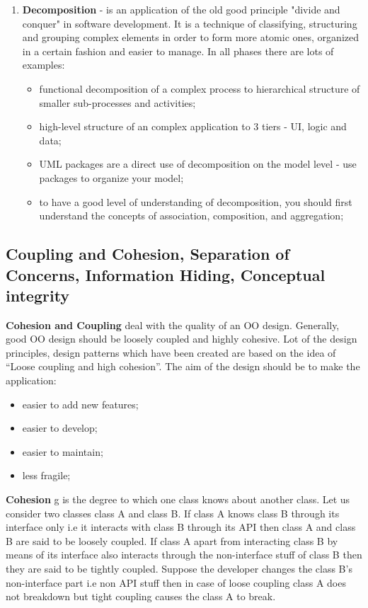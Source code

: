 \documentclass{article}
\begin{document}
\begin{enumerate}
				\item \textbf{Decomposition} - is an application of the old good principle "divide and conquer" in software development. It is a technique of classifying, structuring and grouping complex elements in order to form more atomic ones, organized in a certain fashion and easier to manage. In all phases there are lots of examples:
					\begin{itemize}
						\item functional decomposition of a complex process to hierarchical structure of smaller sub-processes and activities;

						\item  high-level structure of an complex application to 3 tiers - UI, logic and data;

						\item UML packages are a direct use of decomposition on the model level - use packages to organize your model;

						\item to have a good level of understanding of decomposition, you should first understand the concepts of association, composition, and aggregation;
					\end{itemize}
			\end{enumerate}

		\subsection{Coupling and Cohesion, Separation of Concerns, Information Hiding, Conceptual integrity}

			\textbf{Cohesion and Coupling} deal with the quality of an OO design. Generally, good OO design should be loosely coupled and highly cohesive. Lot of the design principles, design patterns which have been created are based on the idea of “Loose coupling and high cohesion”. The aim of the design should be to make the application:
			\begin{itemize}
				\item easier to add new features;
				\item easier to develop;
				\item easier to maintain;
				\item less fragile;
			\end{itemize}

			\bigskip
			\textbf{Cohesion} g is the degree to which one class knows about another class. Let us consider two classes class A and class B. If class A knows class B through its interface only i.e it interacts with class B through its API then class A and class B are said to be loosely coupled. If class A apart from interacting class B by means of its interface also interacts through the non-interface stuff of class B then they are said to be tightly coupled. Suppose the developer changes the class B’s non-interface part i.e non API stuff then in case of loose coupling class A does not breakdown but tight coupling causes the class A to break.
				
\end{document}
